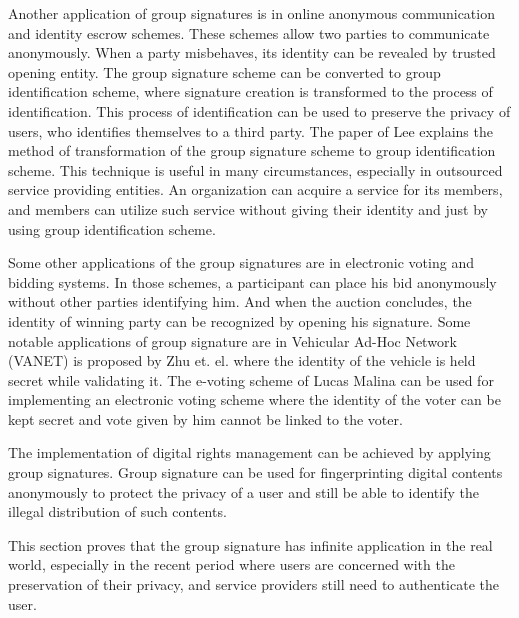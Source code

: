 Another application of group signatures is in online anonymous communication and identity escrow schemes. These schemes allow two parties to communicate anonymously. When a party misbehaves, its identity can be revealed by trusted opening entity. The group signature scheme can be converted to group identification scheme, where signature creation is transformed to the process of identification. This process of identification can be used to preserve the privacy of users, who identifies themselves to a third party. The paper of Lee explains the method of transformation of the group signature scheme to group identification scheme\cite{lee2010fiat}. This technique is useful in many circumstances, especially in outsourced service providing entities. An organization can acquire a service for its members, and members can utilize such service without giving their identity and just by using group identification scheme.

Some other applications of the group signatures are in electronic voting and bidding systems. In those schemes, a participant can place his bid anonymously without other parties identifying him. And when the auction concludes, the identity of winning party can be recognized by opening his signature. Some notable applications of group signature are in Vehicular Ad-Hoc Network (VANET) is proposed by Zhu et. el. where the identity of the vehicle is held secret while validating it\cite{zhu2013privacy}. The e-voting scheme of Lucas Malina can be used for implementing an electronic voting scheme where the identity of the voter can be kept secret and vote given by him cannot be linked to the voter\cite{malina2015secure}. 

The implementation of digital rights management can be achieved by applying group signatures. Group signature can be used for fingerprinting digital contents anonymously to protect the privacy of a user and still be able to identify the illegal distribution of such contents. 

This section proves that the group signature has infinite application in the real world, especially in the recent period where users are concerned with the preservation of their privacy, and service providers still need to authenticate the user.

